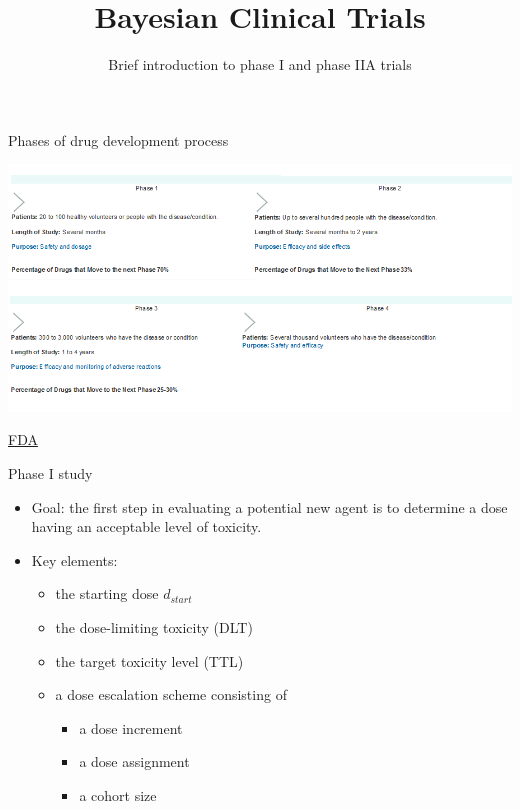 \documentclass{beamer}
\title[]{Bayesian Clinical Trials}
\subtitle{Brief introduction to phase I and phase IIA trials}
\date{}
\begin{document}
\begin{frame}
\titlepage %
\end{frame}

\begin{frame}{Phases of drug development process}

\begin{center}\includegraphics[scale=0.4]{images/Figure1b.png} \end{center}

\href{http://www.fda.org}{FDA}

\end{frame}

\begin{frame}{Phase I study}

\begin{itemize}
\item
  Goal: the first step in evaluating a potential new agent is to
  determine a dose having an acceptable level of toxicity.
\item
  Key elements:

  \begin{itemize}
  \itemsep1pt\parskip0pt
  \item
    the starting dose \(d_{start}\)
  \item
    the dose-limiting toxicity (DLT)
  \item
    the target toxicity level (TTL)
  \item
    a dose escalation scheme consisting of

    \begin{itemize}
    \itemsep1pt\parskip0pt
    \item
      a dose increment
    \item
      a dose assignment
    \item
      a cohort size
    \end{itemize}
  \end{itemize}
\end{itemize}

\end{frame}
\end{document}
